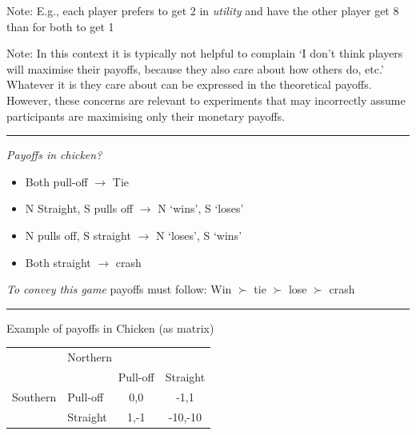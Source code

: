 \documentclass[]{article}
\begin{document}
Note: E.g., each player prefers to get 2 in \emph{utility} and have the other player get 8 than for both to get 1

Note: In this context it is typically not helpful to complain `I don't think players will maximise their payoffs, because they also care about how others do, etc.' Whatever it is they care about can be expressed in the theoretical payoffs.\\

However, these concerns are relevant to experiments that may incorrectly assume participants are maximising only their monetary payoffs.\\

\begin{center}\rule{0.5\linewidth}{\linethickness}\end{center}

\emph{Payoffs in chicken?}

\begin{itemize}
\item
  Both pull-off \(\rightarrow\) Tie
\item
  N Straight, S pulls off \(\rightarrow\) N `wins', S `loses'
\item
  N pulls off, S straight \(\rightarrow\) N `loses', S `wins'
\item
  Both straight \(\rightarrow\) crash
\end{itemize}

\emph{To convey this game} payoffs must follow: Win \(\succ\) tie \(\succ\) lose \(\succ\) crash

\begin{center}\rule{0.5\linewidth}{\linethickness}\end{center}

Example of payoffs in Chicken (as matrix)

\begin{center}
\begin{tabular}{llcc}
                              & \multicolumn{3}{l}{Northern}                                                                  \\ \cline{2-4}
\multicolumn{1}{l|}{}         & \multicolumn{1}{l|}{}          & \multicolumn{1}{l|}{Pull-off} & \multicolumn{1}{l|}{Straight} \\ \cline{2-4}
\multicolumn{1}{l|}{Southern} & \multicolumn{1}{l|}{Pull-off} & \multicolumn{1}{c|}{0,0}       & \multicolumn{1}{c|}{-1,1}    \\ \cline{2-4}
\multicolumn{1}{l|}{}         & \multicolumn{1}{l|}{Straight}    & \multicolumn{1}{c|}{1,-1}       & \multicolumn{1}{c|}{-10,-10}    \\ \cline{2-4}
\end{tabular}
\end{center}
\end{document}
